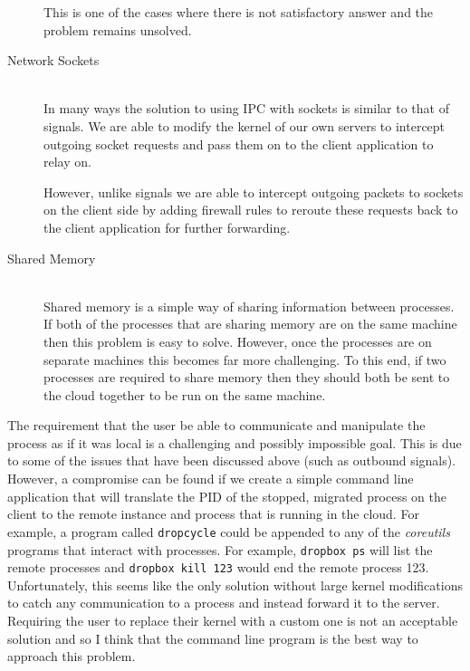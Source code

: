 \documentclass[12pt, a4paper]{article}
\begin{document}
\begin{description}
	This is one of the cases where there is not satisfactory answer and the
	problem remains unsolved.

	\item[Network Sockets] \\

	In many ways the solution to using IPC with sockets is similar to that of
	signals. We are able to modify the kernel of our own servers to intercept
	outgoing socket requests and pass them on to the client application to
	relay on.

	However, unlike signals we are able to intercept outgoing packets to
	sockets on the client side by adding firewall rules to reroute these
	requests back to the client application for further forwarding.

	\item[Shared Memory] \\

	Shared memory is a simple way of sharing information between processes. If
	both of the processes that are sharing memory are on the same machine then
	this problem is easy to solve. However, once the processes are on separate
	machines this becomes far more challenging. To this end, if two processes
	are required to share memory then they should both be sent to the cloud
	together to be run on the same machine.

\end{description}

The requirement that the user be able to communicate and manipulate the process
as if it was local is a challenging and possibly impossible goal. This is due
to some of the issues that have been discussed above (such as outbound
signals). However, a compromise can be found if we create a simple command line
application that will translate the PID of the stopped, migrated process on the
client to the remote instance and process that is running in the cloud. For
example, a program called \texttt{dropcycle} could be appended to any of the
\emph{coreutils} programs that interact with processes. For example,
\texttt{dropbox ps} will list the remote processes and \texttt{dropbox kill
123} would end the remote process 123. Unfortunately, this seems like the only
solution without large kernel modifications to catch any communication to
a process and instead forward it to the server. Requiring the user to replace
their kernel with a custom one is not an acceptable solution and so I think
that the command line program is the best way to approach this problem.
\end{document}
